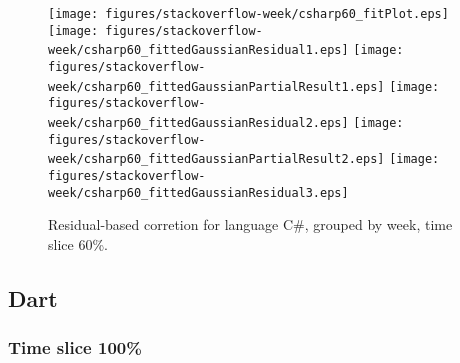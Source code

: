\begin{figure}[hb]
\centering
{}
{\texttt{[image: figures/stackoverflow-week/csharp60\_fitPlot.eps]}}
{\texttt{[image: figures/stackoverflow-week/csharp60\_fittedGaussianResidual1.eps]}}
{\texttt{[image: figures/stackoverflow-week/csharp60\_fittedGaussianPartialResult1.eps]}}
{\texttt{[image: figures/stackoverflow-week/csharp60\_fittedGaussianResidual2.eps]}}
{\texttt{[image: figures/stackoverflow-week/csharp60\_fittedGaussianPartialResult2.eps]}}
{\texttt{[image: figures/stackoverflow-week/csharp60\_fittedGaussianResidual3.eps]}}
\caption{Residual-based corretion for language C\#, grouped by week, time slice 60\%.}
\end{figure}


\clearpage 
\newpage 


\subsection{Dart}

\FloatBarrier

\subsubsection{Time slice 100\%}

